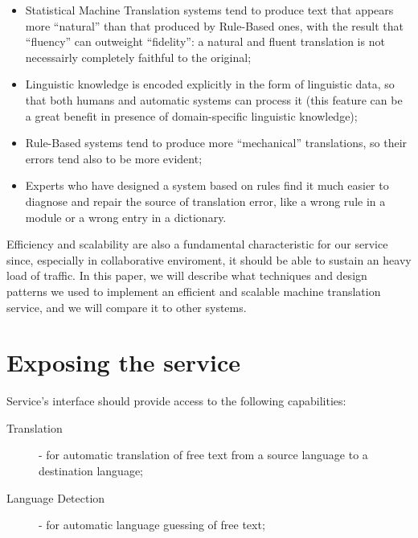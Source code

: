 \documentclass[11pt]{article}
\begin{document}
\begin{itemize}
 \item Statistical Machine Translation systems tend to produce text that appears more ``natural'' than that produced by Rule-Based ones, with
  the result that ``fluency'' can outweight ``fidelity'': a natural and fluent translation is not necessairly completely faithful to the original;
 \item Linguistic knowledge is encoded explicitly in the form of linguistic data, so that both humans and automatic systems can process 
  it (this feature can be a great benefit in presence of domain-specific linguistic knowledge);
 \item Rule-Based systems tend to produce more ``mechanical'' translations, so their errors tend also to be more evident;
 \item Experts who have designed a system based on rules find it much easier to diagnose and repair the source of translation error, like
  a wrong rule in a module or a wrong entry in a dictionary.
\end{itemize}

Efficiency and scalability are also a fundamental characteristic for our service since, especially in collaborative enviroment, it should be able
to sustain an heavy load of traffic. In this paper, we will describe what techniques and design patterns we used to implement an efficient and
scalable machine translation service, and we will compare it to other systems.


\section{Exposing the service}

Service's interface should provide access to the following capabilities:

\begin{description}
  \item[Translation] - for automatic translation of free text from a source language to a destination language;
  \item[Language Detection] - for automatic language guessing of free text;
\end{description}
\end{document}
